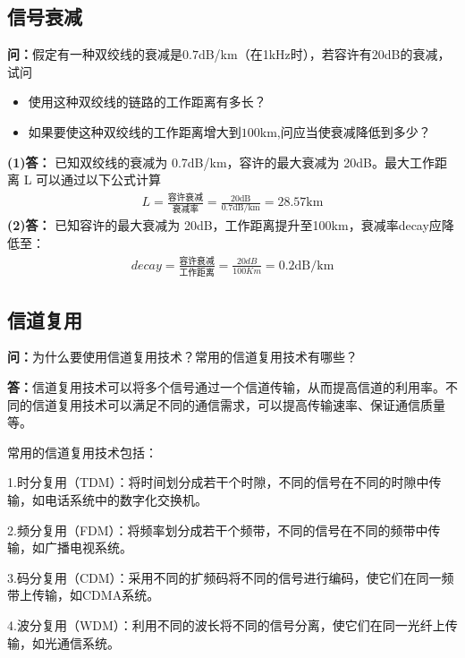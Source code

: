 \documentclass[12pt,hyperref,a4paper,UTF8]{ctexart}
\begin{document}
\subsection{信号衰减}
\textbf{问：}假定有一种双绞线的衰减是$0.7$dB/km（在1kHz时），若容许有$20$dB的衰减，试问
\begin{itemize}
    \item 使用这种双绞线的链路的工作距离有多长？

    \item 如果要使这种双绞线的工作距离增大到$100$km,问应当使衰减降低到多少？
\end{itemize}


\textbf{(1)答：} 已知双绞线的衰减为 0.7dB/km，容许的最大衰减为 20dB。最大工作距离 L 可以通过以下公式计算
\begin{equation}\label{eq:2.4a}
\begin{aligned}
  L = \frac{\text{容许衰减}}{\text{衰减率}} = \frac{20\text{dB}}{0.7\text{dB/km}} = 28.57\text{{km}}
\end{aligned}
\end{equation}
\textbf{(2)答：} 已知容许的最大衰减为 20dB，工作距离提升至100km，衰减率decay应降低至：
\begin{equation}\label{eq:2.4b}
\begin{aligned}
   decay = \frac{\text{容许衰减}}{\text{工作距离}} = \frac{20dB}{100Km} = 0.2\text{{dB/km}}
\end{aligned}
\end{equation}


\subsection{信道复用}
\textbf{问：}为什么要使用信道复用技术？常用的信道复用技术有哪些？

\textbf{答：}信道复用技术可以将多个信号通过一个信道传输，从而提高信道的利用率。不同的信道复用技术可以满足不同的通信需求，可以提高传输速率、保证通信质量等。

常用的信道复用技术包括：

1.时分复用（TDM）：将时间划分成若干个时隙，不同的信号在不同的时隙中传输，如电话系统中的数字化交换机。

2.频分复用（FDM）：将频率划分成若干个频带，不同的信号在不同的频带中传输，如广播电视系统。

3.码分复用（CDM）：采用不同的扩频码将不同的信号进行编码，使它们在同一频带上传输，如CDMA系统。

4.波分复用（WDM）：利用不同的波长将不同的信号分离，使它们在同一光纤上传输，如光通信系统。
\end{document}
